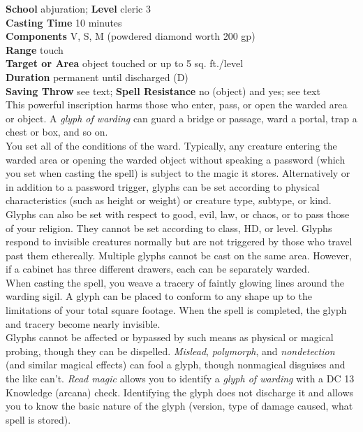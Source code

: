 \textbf{School} abjuration; \textbf{Level} cleric 3\\
\textbf{Casting Time} 10 minutes\\
\textbf{Components} V, S, M (powdered diamond worth 200 gp)\\
\textbf{Range} touch\\
\textbf{Target or Area} object touched or up to 5 sq. ft./level\\
\textbf{Duration} permanent until discharged (D)\\
\textbf{Saving Throw} see text; \textbf{Spell Resistance} no (object) and yes; see text\\
This powerful inscription harms those who enter, pass, or open the warded area or object. A \textit{glyph of warding }can guard a bridge or passage, ward a portal, trap a chest or box, and so on.\\
You set all of the conditions of the ward. Typically, any creature entering the warded area or opening the warded object without speaking a password (which you set when casting the spell) is subject to the magic it stores. Alternatively or in addition to a password trigger, glyphs can be set according to physical characteristics (such as height or weight) or creature type, subtype, or kind. Glyphs can also be set with respect to good, evil, law, or chaos, or to pass those of your religion. They cannot be set according to class, HD, or level. Glyphs respond to invisible creatures normally but are not triggered by those who travel past them ethereally. Multiple glyphs cannot be cast on the same area. However, if a cabinet has three different drawers, each can be separately warded.\\
When casting the spell, you weave a tracery of faintly glowing lines around the warding sigil. A glyph can be placed to conform to any shape up to the limitations of your total square footage. When the spell is completed, the glyph and tracery become nearly invisible.\\
Glyphs cannot be affected or bypassed by such means as physical or magical probing, though they can be dispelled. \textit{Mislead}, \textit{polymorph}, and \textit{nondetection }(and similar magical effects) can fool a glyph, though nonmagical disguises and the like can't. \textit{Read magic }allows you to identify a \textit{glyph of warding }with a DC 13 Knowledge (arcana) check. Identifying the glyph does not discharge it and allows you to know the basic nature of the glyph (version, type of damage caused, what spell is stored).\\
